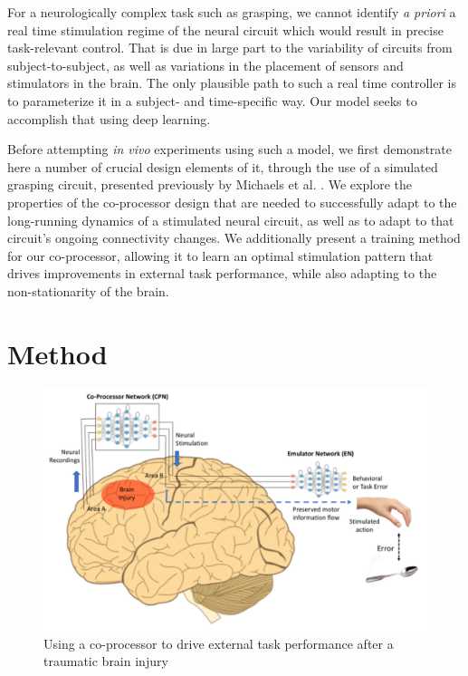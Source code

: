\documentclass[12pt]{iopart}
\begin{document}
For a neurologically complex task such as grasping, we cannot identify
\textit{a priori} a real time stimulation regime of the neural circuit which would
result in precise task-relevant control. That is due in large part to the variability
of circuits from subject-to-subject, as well as variations in the placement of sensors
and stimulators in the brain. The only plausible path to such a real time controller
is to parameterize it in a subject- and time-specific way. Our model seeks to
accomplish that using deep learning.

Before attempting \textit{in vivo} experiments using such a model, we first demonstrate
here a number of crucial design elements of it, through the use of a simulated
grasping circuit, presented previously by Michaels et al. \cite{michaels.mrnn}. We
explore the properties of the co-processor design that are needed to
successfully adapt to the long-running dynamics of a stimulated neural circuit,
as well as to adapt to that circuit's ongoing connectivity changes.
We additionally present a training method for our co-processor, allowing it to learn
an optimal stimulation pattern that drives improvements in external task performance,
while also adapting to the non-stationarity of the brain.

\section{Method}

\begin{figure}
\includegraphics[width=\textwidth]{weill_arch.png}
\caption{Using a co-processor to drive external task performance after a traumatic brain injury}
\centering
\label{fig:weill}
\end{figure}
\end{document}
